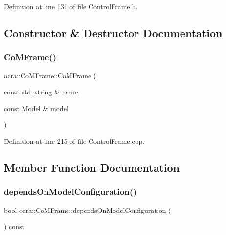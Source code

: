 Definition at line 131 of file Control\+Frame.\+h.



\subsection{Constructor \& Destructor Documentation}
\hypertarget{classocra_1_1CoMFrame_a0b9177034d13b851238da7edfadcdf38}{}\label{classocra_1_1CoMFrame_a0b9177034d13b851238da7edfadcdf38} 
\subsubsection{\texorpdfstring{Co\+M\+Frame()}{CoMFrame()}}
{\footnotesize\ttfamily ocra\+::\+Co\+M\+Frame\+::\+Co\+M\+Frame (\begin{DoxyParamCaption}\item[{const std\+::string \&}]{name,  }\item[{const \hyperlink{classocra_1_1Model}{Model} \&}]{model }\end{DoxyParamCaption})}



Definition at line 215 of file Control\+Frame.\+cpp.



\subsection{Member Function Documentation}
\hypertarget{classocra_1_1CoMFrame_aaae3fd05da2f9e301dbe1c54b57fe624}{}\label{classocra_1_1CoMFrame_aaae3fd05da2f9e301dbe1c54b57fe624} 
\subsubsection{\texorpdfstring{depends\+On\+Model\+Configuration()}{dependsOnModelConfiguration()}}
{\footnotesize\ttfamily bool ocra\+::\+Co\+M\+Frame\+::depends\+On\+Model\+Configuration (\begin{DoxyParamCaption}{ }\end{DoxyParamCaption}) const\hspace{0.3cm}{\ttfamily [virtual]}}



